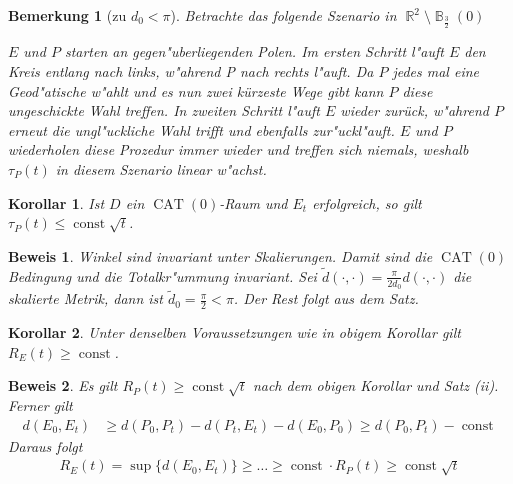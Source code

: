 \documentclass[paper=A4, twoside, chapterprefix=true, bibliography=totoc, headsepline]{scrbook}
\newcommand{\tikzgitter}[3][0.25]{ %
	\draw[step=#1,gray!15] #2 grid #3;
	\draw[step=2*#1,gray!30] #2 grid #3;
	\fill (0,0) circle(0.1); 
}
\DeclareMathOperator{\B}{\mathbb{B}} %
\DeclareMathOperator{\R}{\mathbb{R}}
\DeclareMathOperator{\const}{const} %
\DeclareMathOperator{\CAT}{CAT}
\theoremstyle{break}
\theoremstyle{nonumberbreak}
\newtheorem{kor}{Korollar}
\newtheorem{bem}{Bemerkung}
\newtheorem{bew}{Beweis}
\theoremstyle{emptybreak}
\theoremstyle{break}
\begin{document}
\begin{bem}[zu $d_0 < \pi$]
Betrachte das folgende Szenario in $\R^2 \setminus \B_{\frac{3}{2}}(0)$
\begin{center}\end{center}
$E$ und $P$ starten an gegen"uberliegenden Polen.
Im ersten Schritt l"auft $E$ den Kreis entlang nach links, w"ahrend P nach rechts l"auft.
Da $P$ jedes mal eine Geod"atische w"ahlt und es nun zwei kürzeste Wege gibt kann $P$ diese ungeschickte Wahl treffen.
In zweiten Schritt l"auft $E$ wieder zurück, w"ahrend $P$ erneut die ungl"uckliche Wahl trifft und ebenfalls zur"uckl"auft.
$E$ und $P$ wiederholen diese Prozedur immer wieder und treffen sich niemals, weshalb $\tau_P(t)$ in diesem Szenario linear w"achst.
\end{bem}

\begin{kor}
Ist $D$ ein $\CAT(0)$-Raum und $E_t$ erfolgreich, so gilt $\tau_P(t) \le \const \sqrt{t}$.
\end{kor}

\begin{bew}
Winkel sind invariant unter Skalierungen.
Damit  sind die $\CAT(0)$ Bedingung und die Totalkr"ummung invariant.
Sei $\tilde{d}(\cdot, \cdot) = \frac{\pi}{2 d_0} d(\cdot, \cdot)$ die skalierte Metrik, dann ist $\tilde{d}_0 = \frac{\pi}{2} < \pi$.
Der Rest folgt aus dem Satz.
\end{bew}

\begin{kor}
Unter denselben Voraussetzungen wie in obigem Korollar gilt $R_E(t) \ge \const$.
\end{kor}

\begin{bew}
Es gilt $R_P(t) \ge \const \sqrt{t}$ nach dem obigen Korollar und Satz (ii).
Ferner gilt
\begin{align*}
	d(E_0, E_t) &\ge d(P_0, P_t) - d(P_t, E_t) - d(E_0,P_0) \ge d(P_0, P_t) - \const
\end{align*}
Daraus folgt
\begin{align*}
	R_E(t) = \sup \{ d(E_0, E_t) \} \ge \ldots \ge \const \cdot R_P(t) \ge \const \sqrt t
\end{align*}
\end{bew}
\end{document}
